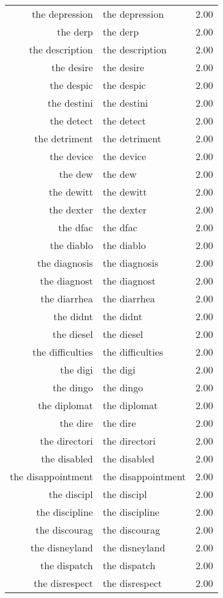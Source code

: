 \begin{table}[ht]
\begin{tabular}{rlr}
  the depression & the depression & 2.00 \\ 
  the derp & the derp & 2.00 \\ 
  the description & the description & 2.00 \\ 
  the desire & the desire & 2.00 \\ 
  the despic & the despic & 2.00 \\ 
  the destini & the destini & 2.00 \\ 
  the detect & the detect & 2.00 \\ 
  the detriment & the detriment & 2.00 \\ 
  the device & the device & 2.00 \\ 
  the dew & the dew & 2.00 \\ 
  the dewitt & the dewitt & 2.00 \\ 
  the dexter & the dexter & 2.00 \\ 
  the dfac & the dfac & 2.00 \\ 
  the diablo & the diablo & 2.00 \\ 
  the diagnosis & the diagnosis & 2.00 \\ 
  the diagnost & the diagnost & 2.00 \\ 
  the diarrhea & the diarrhea & 2.00 \\ 
  the didnt & the didnt & 2.00 \\ 
  the diesel & the diesel & 2.00 \\ 
  the difficulties & the difficulties & 2.00 \\ 
  the digi & the digi & 2.00 \\ 
  the dingo & the dingo & 2.00 \\ 
  the diplomat & the diplomat & 2.00 \\ 
  the dire & the dire & 2.00 \\ 
  the directori & the directori & 2.00 \\ 
  the disabled & the disabled & 2.00 \\ 
  the disappointment & the disappointment & 2.00 \\ 
  the discipl & the discipl & 2.00 \\ 
  the discipline & the discipline & 2.00 \\ 
  the discourag & the discourag & 2.00 \\ 
  the disneyland & the disneyland & 2.00 \\ 
  the dispatch & the dispatch & 2.00 \\ 
  the disrespect & the disrespect & 2.00 \\ 

\end{tabular}
\end{table}
